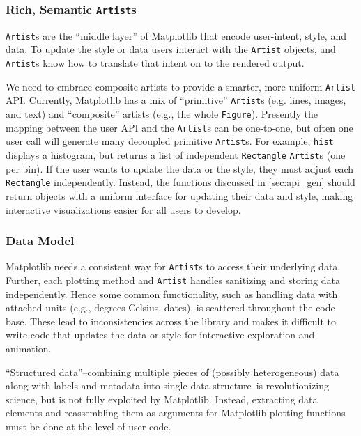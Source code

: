 \documentclass[11pt,letterpaper]{article}  %
\begin{document}
\subsubsection{Rich, Semantic \texttt{Artist}s}
\label{sec:artists}
\texttt{Artist}s are the ``middle layer'' of Matplotlib that encode
user-intent, style, and data.
To update the style or data users interact with the \texttt{Artist}
objects, and \texttt{Artist}s know how to
translate that intent on to the rendered output.

We need to embrace composite artists
to provide a smarter, more uniform \texttt{Artist} API. 
Currently, Matplotlib has a mix of ``primitive'' \texttt{Artist}s
(e.g. lines, images, and text) and ``composite'' artists (e.g.,
the whole \texttt{Figure}). 
Presently the mapping between the user API and the \texttt{Artist}s can be
one-to-one, but often one user call will generate many decoupled
primitive \texttt{Artist}s.
For example, \texttt{hist} displays a histogram,
but returns a list of independent \texttt{Rectangle} \texttt{Artist}s
(one per bin).
If the user wants to update the data or the style,
they must adjust each \texttt{Rectangle} independently.
Instead, the
functions discussed in \ref{sec:api_gen} should return objects with
a uniform interface for updating their data and style, making
interactive visualizations easier for all users to develop.




\subsubsection{Data Model}
\label{sec:dm}

Matplotlib needs a consistent way for \texttt{Artist}s to access their
underlying data.
Further, each plotting method and \texttt{Artist} handles sanitizing
and storing data independently.
Hence some common functionality, such as handling data with attached
units (e.g., degrees Celsius, dates), is scattered throughout the code
base.
These lead to inconsistencies across the library and makes it
difficult to write code that updates the data or style for interactive
exploration and animation.


``Structured data''--combining multiple pieces of (possibly
heterogeneous) data along with labels and metadata into single data
structure--is revolutionizing science, but is not fully exploited by
Matplotlib.
Instead, extracting
data elements and reassembling them as arguments for Matplotlib plotting
functions must be done at the level of user code.
\end{document}
